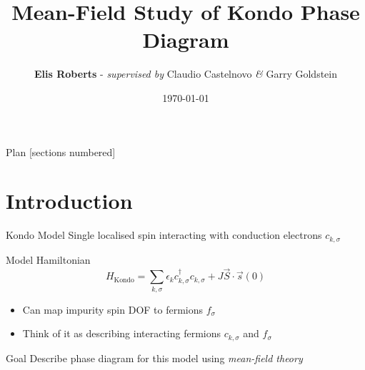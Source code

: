 \documentclass[13pt]{beamer}
\title{Mean-Field Study of Kondo Phase Diagram}
\date{\today}
\author{\textbf{Elis Roberts} - \textit{supervised by} Claudio Castelnovo \textit{\&} Garry Goldstein}
\institute{University of Cambridge}
\begin{document}
  \maketitle

  \begin{frame}{Plan}
  [sections numbered]
  \tableofcontents[hideallsubsections]
  \end{frame}

  \section{Introduction}

  \begin{frame}{Kondo Model}
    Single localised spin interacting with conduction electrons $c^{}_{k,\sigma} $

    \vfill

    \begin{block}{Model Hamiltonian}
      $$ H_{\text{Kondo}}=\sum_{k,\sigma}\epsilon_{k} c_{k,\sigma}^{\dagger}c^{}_{k,\sigma}+J\vec{S}\cdot\vec{s}(0) $$
    \end{block}

    \begin{itemize}
    \item Can map impurity spin DOF to fermions $ f_{\sigma} $
    \item Think of it as describing interacting fermions $ c_{k,\sigma} $ and $ f_{\sigma} $

  \end{itemize}
    \vfill

    \begin{alertblock}{Goal}
      Describe phase diagram for this model using \emph{mean-field theory}
    \end{alertblock}

  \end{frame}
\end{document}
